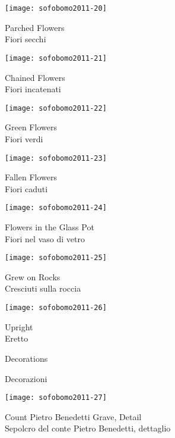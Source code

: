 \begin{center}
\texttt{[image: sofobomo2011-20]}

{Parched Flowers}\\
{\footnotesize Fiori secchi}
\vspace*{\fill}
\newpage

\texttt{[image: sofobomo2011-21]}

{Chained Flowers}\\
{\footnotesize Fiori incatenati}
\vspace*{\fill}
\newpage

\texttt{[image: sofobomo2011-22]}

{Green Flowers}\\
{\footnotesize Fiori verdi}
\vspace*{\fill}
\newpage

\texttt{[image: sofobomo2011-23]}

{Fallen Flowers}\\
{\footnotesize Fiori caduti}
\vspace*{\fill}
\newpage

\texttt{[image: sofobomo2011-24]}

{Flowers in the Glass Pot}\\
{\footnotesize Fiori nel vaso di vetro}
\vspace*{\fill}
\newpage

\texttt{[image: sofobomo2011-25]}

{Grew on Rocks}\\
{\footnotesize Cresciuti sulla roccia}
\vspace*{\fill}
\newpage

\texttt{[image: sofobomo2011-26]}

{Upright}\\
{\footnotesize Eretto}
\vspace*{\fill}
\newpage

\pagestyle{empty}
\vspace*{2in}

\hfill{\textsf{\Huge Decorations}}

\hfill{\textsf{\LARGE Decorazioni}}

\clearpage{\pagestyle{empty}\cleardoublepage}

\pagestyle{plain}

\texttt{[image: sofobomo2011-27]}

{Count Pietro Benedetti Grave, Detail}\\
{\footnotesize Sepolcro del conte Pietro Benedetti, dettaglio}
\vspace*{\fill}
\newpage


\end{center}
